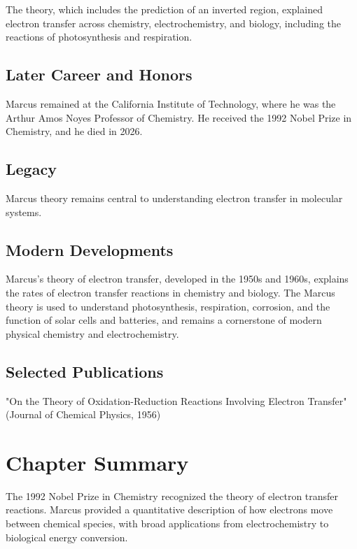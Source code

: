 The theory, which includes the prediction of an inverted region, explained electron transfer across chemistry, electrochemistry, and biology, including the reactions of photosynthesis and respiration.

\subsection*{Later Career and Honors}

Marcus remained at the California Institute of Technology, where he was the Arthur Amos Noyes Professor of Chemistry. He received the 1992 Nobel Prize in Chemistry, and he died in 2026.

\subsection*{Legacy}

Marcus theory remains central to understanding electron transfer in molecular systems.

\subsection*{Modern Developments}

Marcus's theory of electron transfer, developed in the 1950s and 1960s, explains the rates of electron transfer reactions in chemistry and biology. The Marcus theory is used to understand photosynthesis, respiration, corrosion, and the function of solar cells and batteries, and remains a cornerstone of modern physical chemistry and electrochemistry.

\subsection*{Selected Publications}

"On the Theory of Oxidation-Reduction Reactions Involving Electron Transfer" (Journal of Chemical Physics, 1956)

\clearpage

\section*{Chapter Summary}

The 1992 Nobel Prize in Chemistry recognized the theory of electron transfer reactions. Marcus provided a quantitative description of how electrons move between chemical species, with broad applications from electrochemistry to biological energy conversion.

